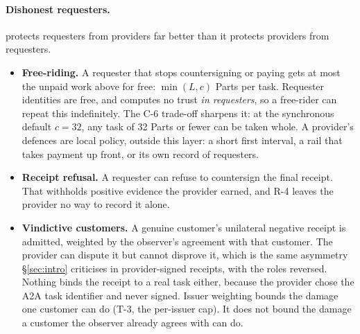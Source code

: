 \paragraph{Dishonest requesters.}
\sys{} protects requesters from providers far better than it protects
providers from requesters.
\begin{itemize}
\item \textbf{Free-riding.} A requester that stops countersigning or
  paying gets at most the unpaid work above for free: $\min(L,c)$ Parts
  per task. Requester identities are free, and \sys{} computes no trust
  \emph{in requesters}, so a free-rider can repeat this indefinitely.
  The C-6 trade-off sharpens it: at the synchronous default $c{=}32$, any
  task of 32 Parts or fewer can be taken whole. A provider's defences are
  local policy, outside this layer: a short first interval, a rail that
  takes payment up front, or its own record of requesters.
\item \textbf{Receipt refusal.} A requester can refuse to countersign the
  final receipt. That withholds positive evidence the provider earned,
  and R-4 leaves the provider no way to record it alone.
\item \textbf{Vindictive customers.} A genuine customer's unilateral
  negative receipt is admitted, weighted by the observer's agreement with
  that customer. The provider can dispute it but cannot disprove it,
  which is the same asymmetry \S\ref{sec:intro} criticises in
  provider-signed receipts, with the roles reversed. Nothing binds the
  receipt to a real task either, because the provider chose the A2A task
  identifier and never signed. Issuer weighting bounds the damage one
  customer can do (T-3, the per-issuer cap). It does not bound the damage
  a customer the observer already agrees with can do.
\end{itemize}

